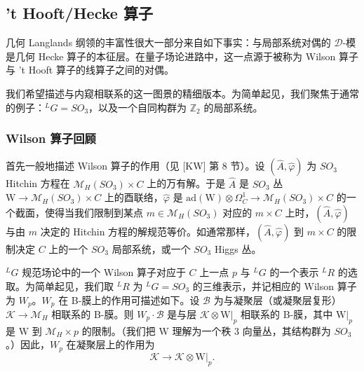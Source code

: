 

\subsection{'t Hooft/Hecke 算子}

几何 Langlands 纲领的丰富性很大一部分来自如下事实：与局部系统对偶的 $\mathcal{D}$-模是几何 Hecke 算子的本征层。在量子场论进路中，这一点源于被称为 Wilson 算子与 't Hooft 算子的线算子之间的对偶。

我们希望描述与内窥相联系的这一图景的精细版本。为简单起见，我们聚焦于通常的例子：${}^{L}G=SO_3$，以及一个自同构群为 $\mathbb{Z}_2$ 的局部系统。


\subsubsection{Wilson 算子回顾}

首先一般地描述 Wilson 算子的作用（见 [KW] 第 8 节）。设 $(\widehat{A},\widehat{\varphi})$ 为 $SO_3$
Hitchin 方程在 $\mathcal{M}_H(SO_3)\times C$ 上的万有解。于是 $\widehat{A}$ 是 $SO_3$ 丛 $\mathrm{W}\to\mathcal{M}_H(SO_3)\times C$ 上的酉联络，$\widehat{\varphi}$ 是 $\mathrm{ad}(\mathrm{W})\otimes\Omega^1_C\to\mathcal{M}_H(SO_3)\times C$ 的一个截面，使得当我们限制到某点 $m\in\mathcal{M}_H(SO_3)$ 对应的 $m\times C$ 上时，$(\widehat{A},\widehat{\varphi})$ 与由 $m$ 决定的 Hitchin 方程的解规范等价。如通常那样，$(\widehat{A},\widehat{\varphi})$ 到 $m\times C$ 的限制决定 $C$ 上的一个 $SO_3$ 局部系统，或一个 $SO_3$ Higgs 丛。

${}^{L}G$ 规范场论中的一个 Wilson 算子对应于 $C$ 上一点 $p$ 与 ${}^{L}G$ 的一个表示 ${}^{L}R$ 的选取。为简单起见，我们取 ${}^{L}R$ 为 ${}^{L}G=SO_3$ 的三维表示，并记相应的 Wilson 算子为 $W_p$。$W_p$ 在 B-膜上的作用可描述如下。设 $\mathcal{B}$ 为与凝聚层（或凝聚层复形）$\mathcal{K}\to\mathcal{M}_H$ 相联系的 B-膜。则 $W_p\cdot\mathcal{B}$ 是与层 $\mathcal{K}\otimes\mathrm{W}|_p$ 相联系的 B-膜，其中 $\mathrm{W}|_p$ 是 $\mathrm{W}$ 到 $\mathcal{M}_H\times p$ 的限制。（我们把 $\mathrm{W}$ 理解为一个秩 3 向量丛，其结构群为 $SO_3$。）因此，$W_p$ 在凝聚层上的作用为
\begin{equation}\tag{5.17}
\mathcal{K}\to\mathcal{K}\otimes\mathrm{W}|_p.
\end{equation}

